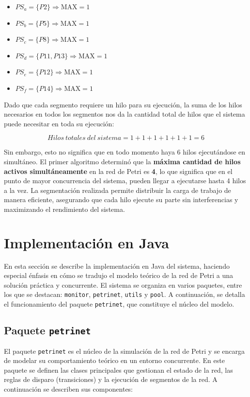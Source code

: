 \documentclass[12pt]{article}
\begin{document}
\begin{itemize}
    \item \(PS_a = \{P2\} \Rightarrow \text{MAX} = 1\)
    \item \(PS_b = \{P5\} \Rightarrow \text{MAX} = 1\)
    \item \(PS_c = \{P8\} \Rightarrow \text{MAX} = 1\)
    \item \(PS_d = \{P11, P13\} \Rightarrow \text{MAX} = 1\)
    \item \(PS_e = \{P12\} \Rightarrow \text{MAX} = 1\)
    \item \(PS_f = \{P14\} \Rightarrow \text{MAX} = 1\)
\end{itemize}
Dado que cada segmento requiere un hilo para su ejecución, la suma de los hilos necesarios en todos los segmentos nos da la cantidad total de hilos que el sistema puede necesitar en toda su ejecución:

\[
Hilos\ totales\ del\ sistema = 1 + 1 + 1 + 1 + 1 + 1 = 6
\]

Sin embargo, esto no significa que en todo momento haya 6 hilos ejecutándose en simultáneo.  
El primer algoritmo determinó que la \textbf{máxima cantidad de hilos activos simultáneamente} en la red de Petri es \textbf{4}, lo que significa que en el punto de mayor concurrencia del sistema, pueden llegar a ejecutarse hasta 4 hilos a la vez.  
La segmentación realizada permite distribuir la carga de trabajo de manera eficiente, asegurando que cada hilo ejecute su parte sin interferencias y maximizando el rendimiento del sistema.


\section{Implementación en Java}

En esta sección se describe la implementación en Java del sistema, haciendo especial énfasis en cómo se tradujo el modelo teórico de la red de Petri a una solución práctica y concurrente. El sistema se organiza en varios paquetes, entre los que se destacan: \texttt{monitor}, \texttt{petrinet}, \texttt{utils} y \texttt{pool}. A continuación, se detalla el funcionamiento del paquete \texttt{petrinet}, que constituye el núcleo del modelo.

\subsection{Paquete \texttt{petrinet}}

El paquete \texttt{petrinet} es el núcleo de la simulación de la red de Petri y se encarga de modelar su comportamiento teórico en un entorno concurrente. En este paquete se definen las clases principales que gestionan el estado de la red, las reglas de disparo (transiciones) y la ejecución de segmentos de la red. A continuación se describen sus componentes:
\end{document}
